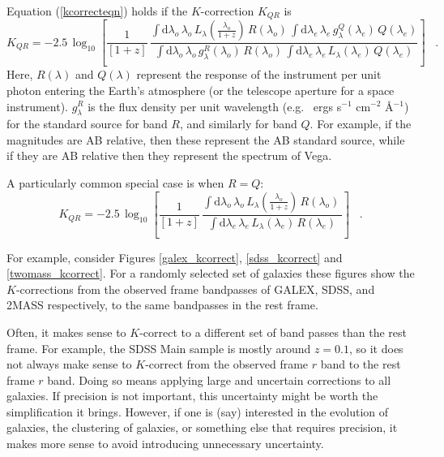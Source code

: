 \documentclass[10pt,preprint]{aastex}
\newcommand{\lambdaobs}{\lambda_o}
\newcommand{\lambdaemit}{\lambda_e}
\begin{document}
Equation (\ref{kcorrecteqn}) holds if the $K$-correction $K_{QR}$ is
\begin{equation}
\label{eq:wavelengthL}
K_{QR} = -2.5\,\log_{10}\left[\frac{1}{[1+z]}\,
  \frac{\displaystyle
  \int\mathrm{d}\lambdaobs\,\lambdaobs\,L_{\lambda}\!\left(\frac{\lambdaobs}{1+z}\right)\,R(\lambdaobs)\,
    \int\mathrm{d}\lambdaemit\,\lambdaemit\,
    g^Q_{\lambda}(\lambdaemit)\,Q(\lambdaemit)}
       {\displaystyle
  \int\mathrm{d}\lambdaobs\,\lambdaobs\,g^R_{\lambda}(\lambdaobs)\,R(\lambdaobs)\,
    \int\mathrm{d}\lambdaemit\,\lambdaemit\,
    L_{\lambda}(\lambdaemit)\,Q(\lambdaemit)}
\right] \;\;\;.
\end{equation}
Here, $R(\lambda)$ and $Q(\lambda)$ represent the response of the
instrument per unit photon entering the Earth's atmosphere (or the
telescope aperture for a space instrument).  $g^R_\lambda$ is the flux
density per unit wavelength (e.g.~ ergs s$^{-1}$ cm$^{-2}$ \AA$^{-1}$)
for the standard source for band $R$, and similarly for band $Q$. For
example, if the magnitudes are AB relative, then these represent the
AB standard source, while if they are AB relative then they represent
the spectrum of Vega. 

A particularly common special case is when $R=Q$:
\begin{equation}
\label{eq:specialL}
K_{QR} = -2.5\,\log_{10}\left[\frac{1}{[1+z]}\,
  \frac{\displaystyle
  \int\mathrm{d}\lambdaobs\,\lambdaobs\,L_{\lambda}\!\left(\frac{\lambdaobs}{1+z}\right)\,R(\lambdaobs)\,}
       {\displaystyle
    \int\mathrm{d}\lambdaemit\,\lambdaemit\,
    L_{\lambda}(\lambdaemit)\,R(\lambdaemit)}
\right] \;\;\;.
\end{equation}

For example, consider Figures \ref{galex_kcorrect},
\ref{sdss_kcorrect} and \ref{twomass_kcorrect}. For a randomly
selected set of galaxies these figures show the $K$-corrections from
the observed frame bandpasses of GALEX, SDSS, and 2MASS respectively,
to the same bandpasses in the rest frame.

Often, it makes sense to $K$-correct to a different set of band passes
than the rest frame. For example, the SDSS Main sample is mostly
around $z=0.1$, so it does not always make sense to $K$-correct from
the observed frame $r$ band to the rest frame $r$ band. Doing so means
applying large and uncertain corrections to all galaxies. If precision
is not important, this uncertainty might be worth the simplification
it brings. However, if one is (say) interested in the evolution of
galaxies, the clustering of galaxies, or something else that requires
precision, it makes more sense to avoid introducing unnecessary
uncertainty.
\end{document}
